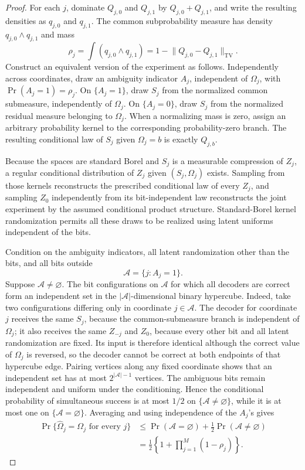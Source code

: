 \documentclass{article}
\begin{document}
\begin{proof}
For each \(j\), dominate \(Q_{j,0}\) and \(Q_{j,1}\) by \(Q_{j,0}+Q_{j,1}\), and write the resulting densities as \(q_{j,0}\) and \(q_{j,1}\).  The common subprobability measure has density \(q_{j,0}\wedge q_{j,1}\) and mass
\[
 \rho_j=\int(q_{j,0}\wedge q_{j,1})
 =1-\lVert Q_{j,0}-Q_{j,1}\rVert_{\mathrm{TV}}.
\]
Construct an equivalent version of the experiment as follows.  Independently across coordinates, draw an ambiguity indicator \(A_j\), independent of \(\Omega_j\), with \(\Pr(A_j=1)=\rho_j\).  On \(\{A_j=1\}\), draw \(S_j\) from the normalized common submeasure, independently of \(\Omega_j\).  On \(\{A_j=0\}\), draw \(S_j\) from the normalized residual measure belonging to \(\Omega_j\).  When a normalizing mass is zero, assign an arbitrary probability kernel to the corresponding probability-zero branch.  The resulting conditional law of \(S_j\) given \(\Omega_j=b\) is exactly \(Q_{j,b}\).

Because the spaces are standard Borel and \(S_j\) is a measurable compression of \(Z_j\), a regular conditional distribution of \(Z_j\) given \((S_j,\Omega_j)\) exists.  Sampling from those kernels reconstructs the prescribed conditional law of every \(Z_j\), and sampling \(Z_0\) independently from its bit-independent law reconstructs the joint experiment by the assumed conditional product structure.  Standard-Borel kernel randomization permits all these draws to be realized using latent uniforms independent of the bits.

Condition on the ambiguity indicators, all latent randomization other than the bits, and all bits outside
\[
 \mathcal A=\{j:A_j=1\}.
\]
Suppose \(\mathcal A\neq\varnothing\).  The bit configurations on \(\mathcal A\) for which all decoders are correct form an independent set in the \(|\mathcal A|\)-dimensional binary hypercube.  Indeed, take two configurations differing only in coordinate \(j\in\mathcal A\).  The decoder for coordinate \(j\) receives the same \(S_j\), because the common-submeasure branch is independent of \(\Omega_j\); it also receives the same \(Z_{-j}\) and \(Z_0\), because every other bit and all latent randomization are fixed.  Its input is therefore identical although the correct value of \(\Omega_j\) is reversed, so the decoder cannot be correct at both endpoints of that hypercube edge.  Pairing vertices along any fixed coordinate shows that an independent set has at most \(2^{|\mathcal A|-1}\) vertices.  The ambiguous bits remain independent and uniform under the conditioning.  Hence the conditional probability of simultaneous success is at most \(1/2\) on \(\{\mathcal A\neq\varnothing\}\), while it is at most one on \(\{\mathcal A=\varnothing\}\).  Averaging and using independence of the \(A_j\)'s gives
\[
\begin{aligned}
 \Pr\{\widehat\Omega_j=\Omega_j\text{ for every }j\}
 &\leq \Pr(\mathcal A=\varnothing)+\frac12\Pr(\mathcal A\neq\varnothing)\\
 &=\frac12\left\{1+\prod_{j=1}^M(1-\rho_j)\right\}.
\end{aligned}
\]


\end{proof}
\end{document}
